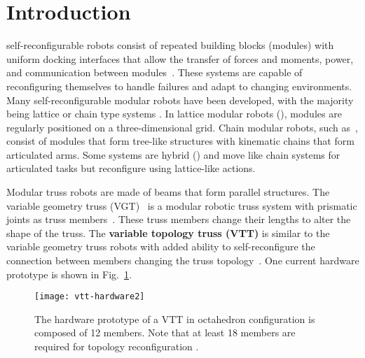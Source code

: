 \documentclass[journal]{IEEEtran}
\begin{document}
\section{Introduction}
%
%
%
%
 self-reconfigurable robots consist of
repeated building blocks (modules) with uniform docking interfaces
that allow the transfer of forces and moments, power, and
communication between modules~\cite{Yim-review-ram-2007}. These
systems are capable of reconfiguring themselves to handle failures and
adapt to changing environments. Many self-reconfigurable modular
robots have been developed, with the majority being lattice or chain
type systems \cite{Yim-review-ram-2007}.  In lattice modular robots
(\cite{Yim-telecube-icra-2002,Gilpin-miche-ijrr-2008}), modules are
regularly positioned on a three-dimensional grid. Chain modular
robots, such as~\cite{Yim-polybot-icra-2000,Yim-ckbot-2009}, consist
of modules that form tree-like structures with kinematic chains that
form articulated arms. Some systems are hybrid
(\cite{Salemi-superbot-iros-2006,Murata-mtran-trm-2002,Liu-smores-reconfig-ral-2019})
and move like chain systems for articulated tasks but reconfigure
using lattice-like actions.

Modular truss robots are made of beams that form parallel
structures. The variable geometry truss
(VGT)~\cite{Miura-vgt-concept-1984} is a modular robotic truss system
with prismatic joints as truss
members~\cite{Hamlin-tetrobot-ram-1997,Lyder-odin-iros-2008,Schwager-lar-iros-2017,Komendera-truss-assembly-ijrr-2015}. These
truss members change their lengths to alter the shape of the truss.
The {\bf variable topology truss (VTT)} is similar to the variable
geometry truss robots with added ability to self-reconfigure the
connection between members changing the truss
topology~\cite{Spinos-vtt-iros-2017, vtt-review-ur-2018}. One current
hardware prototype is shown in Fig.~\ref{fig:vtt-hardware}.

\begin{figure}[t]
  \centering
  \texttt{[image: vtt-hardware2]}
  \caption{The hardware prototype of a VTT in octahedron configuration
    is composed of 12 members. Note that at least 18 members are
    required for topology reconfiguration
    \cite{Spinos-vtt-iros-2017}.}
  \label{fig:vtt-hardware}
\end{figure}
\end{document}
